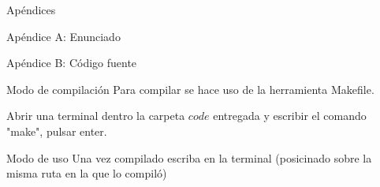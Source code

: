 \begin{section}{Apéndices}
	\begin{subsection}{Apéndice A: Enunciado}
		
	\end{subsection}
	\begin{subsection}{Apéndice B: Código fuente}
		\begin{subsection}{Modo de compilación}
			Para compilar se hace uso de la herramienta Makefile.
			
			Abrir una terminal dentro la carpeta $code$ entregada y escribir el comando "make", pulsar enter.
		\end{subsection}	
		\begin{subsection}{Modo de uso}
			Una vez compilado escriba en la terminal (posicinado sobre la misma ruta en la que lo compiló)
		\end{subsection}	
	\end{subsection}	
\end{section}
